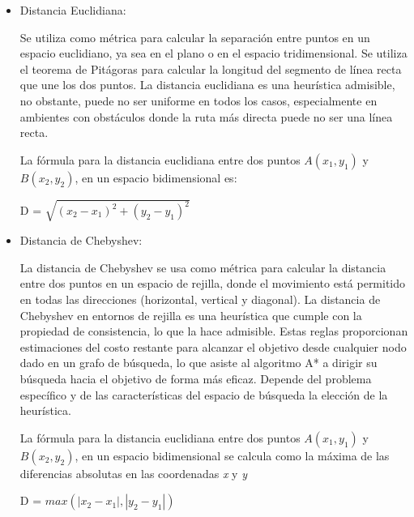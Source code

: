 \begin{itemize}
    \item Distancia Euclidiana:

Se utiliza como métrica para calcular la separación entre puntos en un espacio euclidiano, ya sea en el plano o en el espacio tridimensional. Se utiliza el teorema de Pitágoras para calcular la longitud del segmento de línea recta que une los dos puntos. La distancia euclidiana es una heurística admisible, no obstante, puede no ser uniforme en todos los casos, especialmente en ambientes con obstáculos donde la ruta más directa puede no ser una línea recta.

La fórmula para la distancia euclidiana entre dos puntos $A(x_1, y_1)$ y $B(x_2,y_2)$, en un espacio bidimensional es:
\begin{center}
    D = $\sqrt{(x_2 - x_1)^2 + (y_2 - y_1)^2}$
\end{center}

  \item  Distancia de Chebyshev:
  
La distancia de Chebyshev se usa como métrica para calcular la distancia entre dos puntos en un espacio de rejilla, donde el movimiento está permitido en todas las direcciones (horizontal, vertical y diagonal).
La distancia de Chebyshev en entornos de rejilla es una heurística que cumple con la propiedad de consistencia, lo que la hace admisible.
Estas reglas proporcionan estimaciones del costo restante para alcanzar el objetivo desde cualquier nodo dado en un grafo de búsqueda, lo que asiste al algoritmo A* a dirigir su búsqueda hacia el objetivo de forma más eficaz. Depende del problema específico y de las características del espacio de búsqueda la elección de la heurística.

La fórmula para la distancia euclidiana entre dos puntos $A(x_1, y_1)$ y $B(x_2,y_2)$, en un espacio bidimensional se calcula como la máxima de las diferencias absolutas en las coordenadas \textit{x} y \textit{y}
\begin{center}
    D = $max(|x_2 - x_1|,|y_2 - y_1|)$
\end{center}

\end{itemize}


